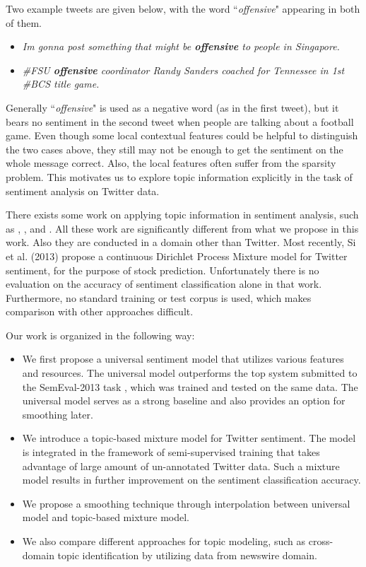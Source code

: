 \documentclass[11pt]{article}
\begin{document}
Two example tweets are given below, with the word ``\textit{offensive}" appearing in both of them.

\begin{itemize}
\item \textit{Im gonna post something that might be {\bf offensive} to people in Singapore.}
\item \textit{\#FSU {\bf offensive} coordinator Randy Sanders coached for Tennessee in 1st \#BCS title game.}
\end{itemize}
Generally ``\textit{offensive}" is used as a negative word (as in the first tweet), but it bears no sentiment 
in the second tweet when people are talking about a football game.
Even though some local contextual features could be helpful to distinguish the two cases above,
they still may not be enough to get the sentiment on the whole message correct. 
Also, the local features often suffer from the sparsity problem.
This motivates us to explore topic information explicitly in the task of sentiment analysis on Twitter data.

There exists some work on applying topic information in sentiment analysis,
such as \cite{Mei:07}, \cite{Branavan:08}, \cite{Jo:11} and \cite{He:12}.
All these work are significantly different from what we propose in this work. Also they are 
conducted in a domain other than Twitter. Most recently, Si et al. (2013) propose a continuous Dirichlet Process
Mixture model for Twitter sentiment, for the purpose of stock prediction. Unfortunately there is no evaluation on the
accuracy of sentiment classification alone in that work. Furthermore, no standard
training or test corpus is used, which makes comparison with other approaches difficult.

Our work is organized in the following way:

\begin{itemize}
\item We first propose a universal sentiment model that utilizes various features and resources. The universal
model outperforms the top system submitted to the SemEval-2013 task \cite{Mohammad:13}, 
which was trained and tested
on the same data. The universal model serves as a strong baseline and also provides an option for smoothing later.
\item We introduce a topic-based mixture model for Twitter sentiment. The model is integrated in the framework of
semi-supervised training that takes advantage of large amount of un-annotated Twitter data. Such a mixture model
results in further improvement on the sentiment classification accuracy.
\item We propose a smoothing technique through interpolation between universal model and topic-based mixture model.
\item We also compare different approaches for topic modeling, such as cross-domain topic identification by
utilizing data from newswire domain.
\end{itemize}
\end{document}
